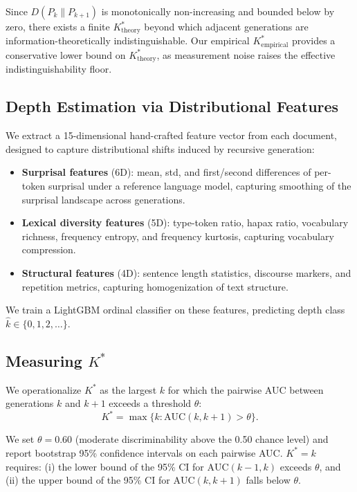 \documentclass[11pt,a4paper]{article}
\newcommand{\Kstar}{K^{*}}
\newcommand{\AUC}{\mathrm{AUC}}
\begin{document}
Since $D(P_k \| P_{k+1})$ is monotonically non-increasing and bounded below by zero, there exists a finite $\Kstar_{\mathrm{theory}}$ beyond which adjacent generations are information-theoretically indistinguishable.
Our empirical $\Kstar_{\mathrm{empirical}}$ provides a conservative lower bound on $\Kstar_{\mathrm{theory}}$, as measurement noise raises the effective indistinguishability floor.

\subsection{Depth Estimation via Distributional Features}
\label{sec:features}

We extract a 15-dimensional hand-crafted feature vector from each document, designed to capture distributional shifts induced by recursive generation:

\begin{itemize}[nosep,leftmargin=1.5em]
    \item \textbf{Surprisal features} (6D): mean, std, and first/second differences of per-token surprisal under a reference language model, capturing smoothing of the surprisal landscape across generations.
    \item \textbf{Lexical diversity features} (5D): type-token ratio, hapax ratio, vocabulary richness, frequency entropy, and frequency kurtosis, capturing vocabulary compression.
    \item \textbf{Structural features} (4D): sentence length statistics, discourse markers, and repetition metrics, capturing homogenization of text structure.
\end{itemize}

We train a LightGBM ordinal classifier on these features, predicting depth class $\hat{k} \in \{0, 1, 2, \ldots\}$.

\subsection{Measuring $\Kstar$}
\label{sec:kstar-def}

We operationalize $\Kstar$ as the largest $k$ for which the pairwise AUC between generations $k$ and $k+1$ exceeds a threshold $\theta$:
\begin{equation}
    \Kstar = \max\{k : \AUC(k, k+1) > \theta\}.
    \label{eq:kstar}
\end{equation}

We set $\theta = 0.60$ (moderate discriminability above the 0.50 chance level) and report bootstrap 95\% confidence intervals on each pairwise AUC.
$\Kstar = k$ requires: (i) the lower bound of the 95\% CI for $\AUC(k-1, k)$ exceeds $\theta$, and (ii) the upper bound of the 95\% CI for $\AUC(k, k+1)$ falls below $\theta$.
\end{document}

